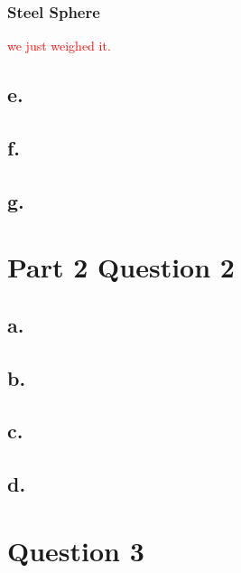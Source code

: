 \documentclass{article}
\newcommand{\xxx}[1]{\textcolor{red}{#1}}
\theoremstyle{plain}
\theoremstyle{definition}
\theoremstyle{remark}
\begin{document}
\subsubsection{Steel Sphere}
\xxx{we just weighed it.}

\subsection*{e.}

\subsection*{f.}

\subsection*{g.}

\section{Part 2 Question 2}

\subsection*{a.}

\subsection*{b.}

\subsection*{c.}

\subsection*{d.}

\section*{Question 3}
\end{document}
